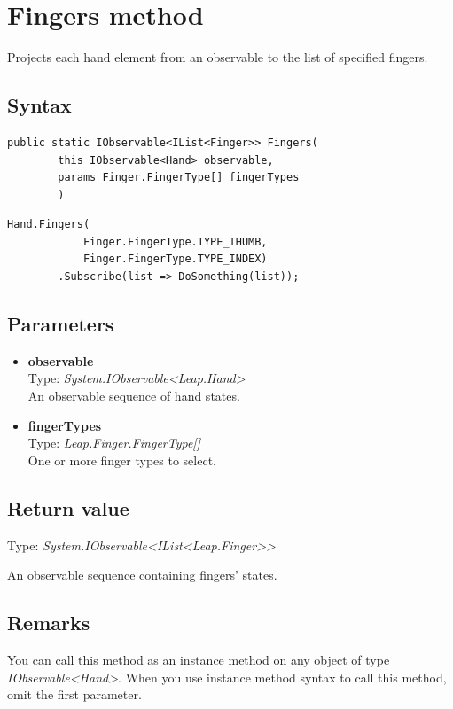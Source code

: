 \documentclass[12pt,a4paper,twoside]{report}
\begin{document}
\section{Fingers method}
Projects each hand element from an observable to the list of specified fingers.

\subsection{Syntax}
\begin{lstlisting}[caption=Declaration]
    public static IObservable<IList<Finger>> Fingers(
        this IObservable<Hand> observable,
        params Finger.FingerType[] fingerTypes
        )
\end{lstlisting}

\begin{lstlisting}[caption=Usage example]
    Hand.Fingers(
            Finger.FingerType.TYPE_THUMB,
            Finger.FingerType.TYPE_INDEX)
        .Subscribe(list => DoSomething(list));
\end{lstlisting}

\subsection{Parameters}
\begin{itemize}
    \item \textbf{observable} \\
        Type: \textit{System.IObservable<Leap.Hand>} \\
        An observable sequence of hand states.
    \item \textbf{fingerTypes} \\
        Type: \textit{Leap.Finger.FingerType[]} \\
        One or more finger types to select.
\end{itemize}

\subsection{Return value}
Type: \textit{System.IObservable<IList<Leap.Finger>{}>}

An observable sequence containing fingers' states.

\subsection{Remarks}
You can call this method as an instance method on any object of type \textit{IObservable<Hand>}. When you use 
instance method syntax to call this method, omit the first parameter.
\end{document}
